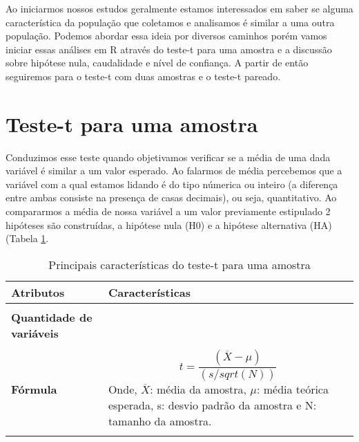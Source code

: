 \documentclass[14pt,titlepage, oneside, openany, a4paper]{book}
\begin{document}
Ao iniciarmos nossos estudos geralmente estamos interessados em saber se alguma característica da população que coletamos e analisamos é similar a uma outra população. Podemos abordar essa ideia por diversos caminhos porém vamos iniciar essas análises em R através do teste-t para uma amostra e a discussão sobre hipótese nula, caudalidade e nível de confiança. A partir de então seguiremos para o teste-t com duas amostras e o teste-t pareado.

\hypertarget{teste-t-para-uma-amostra}{%
\section{Teste-t para uma amostra}\label{teste-t-para-uma-amostra}}

Conduzimos esse teste quando objetivamos verificar se a média de uma dada variável é similar a um valor esperado. Ao falarmos de média percebemos que a variável com a qual estamos lidando é do tipo númerica ou inteiro (a diferença entre ambas consiste na presença de casas decimais), ou seja, quantitativo. Ao compararmos a média de nossa variável a um valor previamente estipulado 2 hipóteses são construídas, a hipótese nula (H0) e a hipótese alternativa (HA) (Tabela \ref{tab:tab1t}.

\begin{table}

\caption{\label{tab:tab1t}Principais características do teste-t para uma amostra}
\centering
\begin{tabular}[c]{>{\raggedright\arraybackslash}p{10em}>{\raggedright\arraybackslash}p{30em}}
\toprule
Atributos & Características\\
\midrule
\textbf{\cellcolor{gray!6}{Tipo de variável}} & \cellcolor{gray!6}{Quantitativa}\\
\textbf{Quantidade de variáveis} & 1\\
\textbf{\cellcolor{gray!6}{Hipótese nula}} & \cellcolor{gray!6}{A média da variável é similar ao valor previamente estipulado}\\
\textbf{Fórmula} & $$t=\frac{(\overline{X}-\mu)}{(s/sqrt(N))}$$ Onde, $\overline{X}$: média da amostra, $\mu$: média teórica esperada, s: desvio padrão da amostra e N: tamanho da amostra.\\
\textbf{\cellcolor{gray!6}{Observação}} & \cellcolor{gray!6}{Não há a necessidade de post-hoc nem expressa-la graficamente}\\
\bottomrule
\end{tabular}
\end{table}
\end{document}
